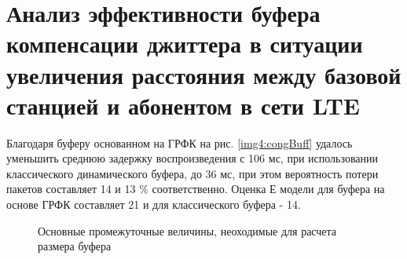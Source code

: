 \section{Анализ эффективности буфера компенсации джиттера в ситуации увеличения расстояния между базовой станцией и абонентом в сети LTE} \label{sect4}



Благодаря буферу основанном на ГРФК на рис. \ref{img4:congBuff} удалось уменьшить среднюю задержку воспроизведения с 106 мс, при использовании классического динамического буфера, до 36 мс, при этом вероятность потери пакетов составляет 14 и 13 \% соответственно. Оценка Е модели для буфера на основе ГРФК составляет 21 и для классического буфера - 14.



\pgfplotsset{width=15cm, height=10cm, compat=1.3}
\begin{figure} [!h]
  \center
{}
\caption{Основные промежуточные величины, неоходимые для расчета размера буфера}
  \label{img4:distEst}
\end{figure}





